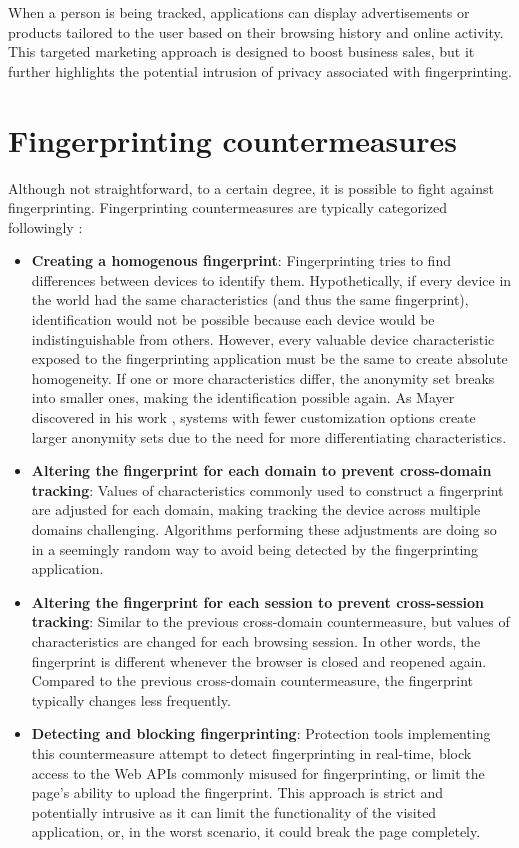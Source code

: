 When a person is being tracked, applications can display advertisements or products tailored to the user based on their browsing history and online activity. This targeted marketing approach is designed to boost business sales, but it further highlights the potential intrusion of privacy associated with fingerprinting.

\section{Fingerprinting countermeasures}
\label{Section:FingerprintingCounter}

Although not straightforward, to a certain degree, it is possible to fight against fingerprinting. Fingerprinting countermeasures are typically categorized followingly \cite{JShelterPaper, PriVaricator}:

\begin{itemize}
	\item \textbf{Creating a homogenous fingerprint}: Fingerprinting tries to find differences between devices to identify them. Hypothetically, if every device in the world had the same characteristics (and thus the same fingerprint), identification would not be possible because each device would be indistinguishable from others. However, every valuable device characteristic exposed to the fingerprinting application must be the same to create absolute homogeneity. If one or more characteristics differ, the anonymity set breaks into smaller ones, making the identification possible again. As Mayer discovered in his work \cite{MayerAnyPerson}, systems with fewer customization options create larger anonymity sets due to the need for more differentiating characteristics.
	\item \textbf{Altering the fingerprint for each domain to prevent cross-domain tracking}: Values of characteristics commonly used to construct a fingerprint are adjusted for each domain, making tracking the device across multiple domains challenging. Algorithms performing these adjustments are doing so in a seemingly random way to avoid being detected by the fingerprinting application.
	\item \textbf{Altering the fingerprint for each session to prevent cross-session tracking}: Similar to the previous cross-domain countermeasure, but values of characteristics are changed for each browsing session. In other words, the fingerprint is different whenever the browser is closed and reopened again. Compared to the previous cross-domain countermeasure, the fingerprint typically changes less frequently.
	\item \textbf{Detecting and blocking fingerprinting}: Protection tools implementing this countermeasure attempt to detect fingerprinting in real-time, block access to the Web APIs commonly misused for fingerprinting, or limit the page's ability to upload the fingerprint. This approach is strict and potentially intrusive as it can limit the functionality of the visited application, or, in the worst scenario, it could break the page completely.
\end{itemize}

